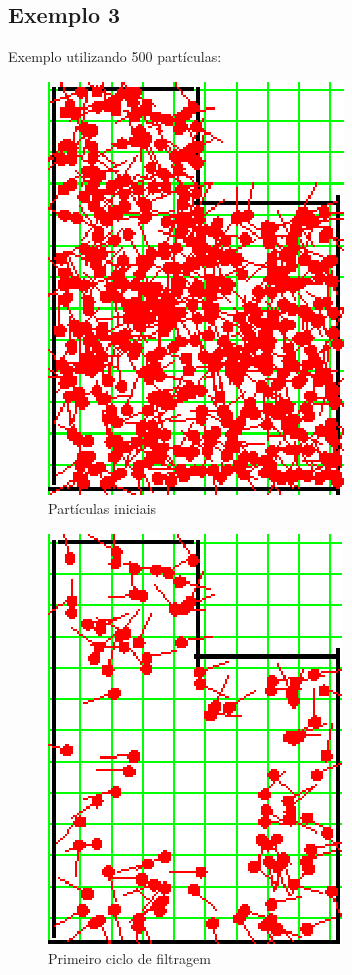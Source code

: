 \subsection{Exemplo 3}

Exemplo utilizando 500 partículas:

\begin{figure}[H]
  \centering
  \includegraphics[scale=0.6]{figuras/cen1_ex3/1.eps}
  \caption[Partículas Iniciais]{Partículas iniciais}
  \label{img:cen1_ex3_1}
\end{figure}

\begin{figure}[H]
  \centering
  \includegraphics[scale=0.6]{figuras/cen1_ex3/2.eps}
  \caption[Primeiro Ciclo de Filtragem]{Primeiro ciclo de filtragem}
  \label{img:cen1_ex3_2}
\end{figure}

